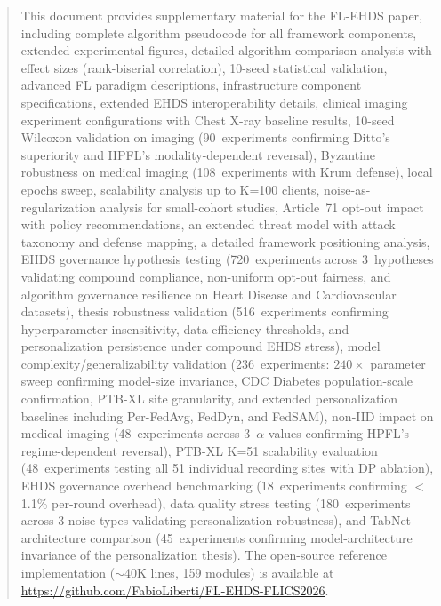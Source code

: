 \documentclass[conference]{IEEEtran}
\begin{document}
\begin{abstract}
This document provides supplementary material for the FL-EHDS paper, including complete algorithm pseudocode for all framework components, extended experimental figures, detailed algorithm comparison analysis with effect sizes (rank-biserial correlation), 10-seed statistical validation, advanced FL paradigm descriptions, infrastructure component specifications, extended EHDS interoperability details, clinical imaging experiment configurations with Chest X-ray baseline results, 10-seed Wilcoxon validation on imaging (90~experiments confirming Ditto's superiority and HPFL's modality-dependent reversal), Byzantine robustness on medical imaging (108~experiments with Krum defense), local epochs sweep, scalability analysis up to K=100 clients, noise-as-regularization analysis for small-cohort studies, Article~71 opt-out impact with policy recommendations, an extended threat model with attack taxonomy and defense mapping, a detailed framework positioning analysis, EHDS governance hypothesis testing (720~experiments across 3~hypotheses validating compound compliance, non-uniform opt-out fairness, and algorithm governance resilience on Heart Disease and Cardiovascular datasets), thesis robustness validation (516~experiments confirming hyperparameter insensitivity, data efficiency thresholds, and personalization persistence under compound EHDS stress), model complexity/generalizability validation (236~experiments: $240\times$ parameter sweep confirming model-size invariance, CDC Diabetes population-scale confirmation, PTB-XL site granularity, and extended personalization baselines including Per-FedAvg, FedDyn, and FedSAM), non-IID impact on medical imaging (48~experiments across 3~$\alpha$ values confirming HPFL's regime-dependent reversal), PTB-XL K=51 scalability evaluation (48~experiments testing all 51 individual recording sites with DP ablation), EHDS governance overhead benchmarking (18~experiments confirming $<$1.1\% per-round overhead), data quality stress testing (180~experiments across 3 noise types validating personalization robustness), and TabNet architecture comparison (45~experiments confirming model-architecture invariance of the personalization thesis). The open-source reference implementation ($\sim$40K lines, 159 modules) is available at \url{https://github.com/FabioLiberti/FL-EHDS-FLICS2026}.
\end{abstract}

\tableofcontents
\clearpage

\appendices
\renewcommand{\thesubsubsection}{\thesubsection.\arabic{subsubsection}}
\end{document}
